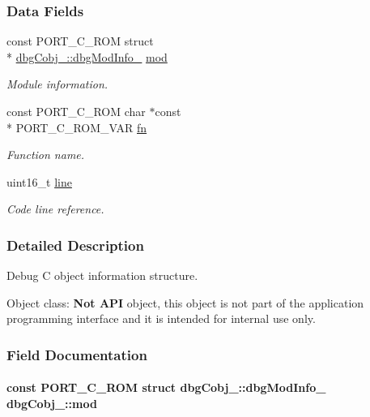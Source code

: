 \subsubsection*{Data Fields}
\begin{DoxyCompactItemize}
\item 
const P\-O\-R\-T\-\_\-\-C\-\_\-\-R\-O\-M struct \\*
\hyperlink{structdbgCobj___1_1dbgModInfo__}{dbg\-Cobj\-\_\-\-::dbg\-Mod\-Info\-\_\-} \hyperlink{structdbgCobj___aac593734f9c5c3ffd4b5051337496676}{mod}
\begin{DoxyCompactList}\small\item\em Module information. \end{DoxyCompactList}\item 
const P\-O\-R\-T\-\_\-\-C\-\_\-\-R\-O\-M char $\ast$const \\*
P\-O\-R\-T\-\_\-\-C\-\_\-\-R\-O\-M\-\_\-\-V\-A\-R \hyperlink{structdbgCobj___abc021a180df6778b04bdf68bed334521}{fn}
\begin{DoxyCompactList}\small\item\em Function name. \end{DoxyCompactList}\item 
uint16\-\_\-t \hyperlink{structdbgCobj___a3eed823624880e32658ec0ec9d974e1e}{line}
\begin{DoxyCompactList}\small\item\em Code line reference. \end{DoxyCompactList}\end{DoxyCompactItemize}


\subsubsection{Detailed Description}
Debug C object information structure. 

\begin{DoxyParagraph}{Object class\-:}
{\bfseries Not A\-P\-I} object, this object is not part of the application programming interface and it is intended for internal use only. 
\end{DoxyParagraph}


\subsubsection{Field Documentation}
\hypertarget{structdbgCobj___aac593734f9c5c3ffd4b5051337496676}{
\paragraph[{mod}]{\setlength{\rightskip}{0pt plus 5cm}const P\-O\-R\-T\-\_\-\-C\-\_\-\-R\-O\-M struct {\bf dbg\-Cobj\-\_\-\-::dbg\-Mod\-Info\-\_\-} dbg\-Cobj\-\_\-\-::mod}}\label{structdbgCobj___aac593734f9c5c3ffd4b5051337496676}


